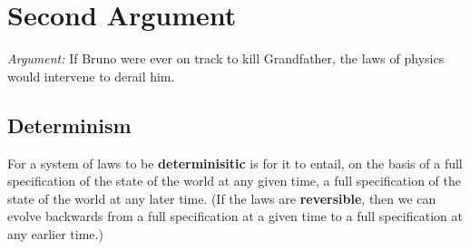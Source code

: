 \documentclass[12pt]{extarticle}
\begin{document}
\section{Second Argument}

\emph{Argument:} If Bruno were ever on track to kill Grandfather, the laws of physics would intervene to derail him.



\subsection{Determinism}

For a system of laws to be \textbf{determinisitic} is for it to entail, on the basis of a full specification of the state of the world at any given time, a full specification of the state of the world at any later time. (If the laws are \textbf{reversible}, then we can evolve backwards from a full specification at a given time to a full specification at any earlier time.)
\end{document}
